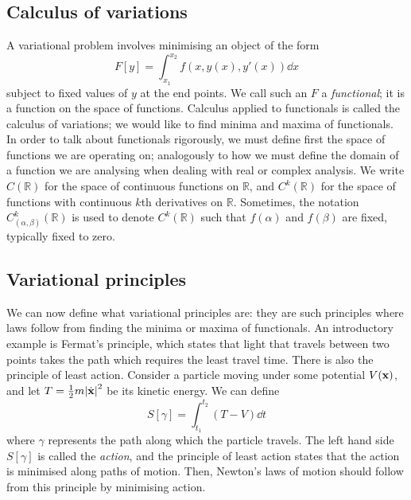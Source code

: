 \subsection{Calculus of variations}
A variational problem involves minimising an object of the form
\[
	F[y] = \int_{x_1}^{x_2} f(x, y(x), y'(x)) \dd{x}
\]
subject to fixed values of \(y\) at the end points.
We call such an \(F\) a \textit{functional}; it is a function on the space of functions.
Calculus applied to functionals is called the calculus of variations; we would like to find minima and maxima of functionals.
In order to talk about functionals rigorously, we must define first the space of functions we are operating on; analogously to how we must define the domain of a function we are analysing when dealing with real or complex analysis.
We write \(C(\mathbb R)\) for the space of continuous functions on \(\mathbb R\), and \(C^k(\mathbb R)\) for the space of functions with continuous \(k\)th derivatives on \(\mathbb R\).
Sometimes, the notation \(C_{(\alpha, \beta)}^k(\mathbb R)\) is used to denote \(C^k(\mathbb R)\) such that \(f(\alpha)\) and \(f(\beta)\) are fixed, typically fixed to zero.

\subsection{Variational principles}
We can now define what variational principles are: they are such principles where laws follow from finding the minima or maxima of functionals.
An introductory example is Fermat's principle, which states that light that travels between two points takes the path which requires the least travel time.
There is also the principle of least action.
Consider a particle moving under some potential \(V(\vb x)\), and let \(T = \frac{1}{2}m\abs{\dot {\vb x}}^2\) be its kinetic energy.
We can define
\[
	S[\gamma] = \int_{t_1}^{t_2} (T - V)\dd{t}
\]
where \(\gamma\) represents the path along which the particle travels.
The left hand side \(S[\gamma]\) is called the \textit{action}, and the principle of least action states that the action is minimised along paths of motion.
Then, Newton's laws of motion should follow from this principle by minimising action.
